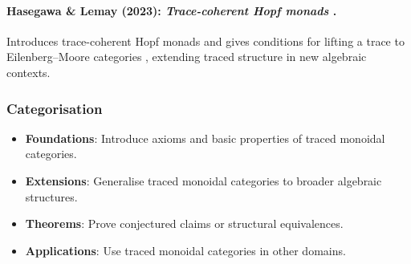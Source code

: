 \paragraph{Hasegawa \& Lemay (2023): \emph{Trace-coherent Hopf monads} \cite{hasegawa2023-traced-monads-hopf}.}
Introduces trace-coherent Hopf monads and gives conditions for lifting a trace to Eilenberg--Moore categories \cite{eilenberg1965-adjoint-functors-triples}, extending traced structure in new algebraic contexts.
\subsubsection*{Categorisation}
\begin{itemize}
	\item \textbf{Foundations}: Introduce axioms and basic properties of traced monoidal categories.
	\item \textbf{Extensions}: Generalise traced monoidal categories to broader algebraic structures.
	\item \textbf{Theorems}: Prove conjectured claims or structural equivalences.
	\item \textbf{Applications}: Use traced monoidal categories in other domains.
\end{itemize}
